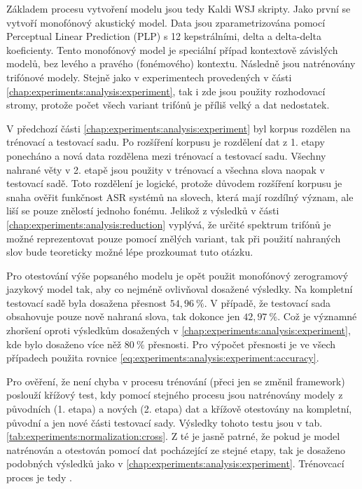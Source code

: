Základem procesu vytvoření modelu jsou tedy Kaldi WSJ skripty. Jako první se vytvoří monofónový akustický model. Data jsou zparametrizována pomocí Perceptual Linear Prediction (PLP) s 12 kepstrálními, delta a delta-delta koeficienty. Tento monofónový model je speciální případ kontextově závislých modelů, bez levého a pravého (fonémového) kontextu. Následně jsou natrénovány trifónové modely. Stejně jako v experimentech provedených v části \ref{chap:experiments:analysis:experiment}, tak i zde jsou použity rozhodovací stromy, protože počet všech variant trifónů je příliš velký a dat nedostatek.

V předchozí části \ref{chap:experiments:analysis:experiment} byl korpus rozdělen na trénovací a testovací sadu. Po rozšíření korpusu je rozdělení dat z 1. etapy ponecháno a nová data rozdělena mezi trénovací a testovací sadu. Všechny nahrané věty v 2. etapě jsou použity v trénovací a všechna slova naopak v testovací sadě. Toto rozdělení je logické, protože důvodem rozšíření korpusu je snaha ověřit funkčnost ASR systémů na slovech, která mají rozdílný význam, ale liší se pouze znělostí jednoho fonému. Jelikož z výsledků v části \ref{chap:experiments:analysis:reduction} vyplývá, že určité spektrum trifónů je možné reprezentovat pouze pomocí znělých variant, tak při použití nahraných slov bude teoreticky možné lépe prozkoumat tuto otázku.

Pro otestování výše popsaného modelu je opět použit monofónový zerogramový jazykový model tak, aby co nejméně ovlivňoval dosažené výsledky. Na kompletní testovací sadě byla dosažena přesnost $54,96\ \%$. V případě, že testovací sada obsahovuje pouze nově nahraná slova, tak dokonce jen $42,97\ \%$. Což je významné zhoršení oproti výsledkům dosažených v \ref{chap:experiments:analysis:experiment}, kde bylo dosaženo více něž $80\ \%$ přesnosti. Pro výpočet přesnosti je ve všech případech použita rovnice \ref{eq:experiments:analysis:experiment:accuracy}.

Pro ověření, že není chyba v procesu trénování (přeci jen se změnil framework) poslouží křížový test, kdy pomocí stejného procesu jsou natrénovány modely z původních (1. etapa) a nových (2. etapa) dat a křížově otestovány na kompletní, původní a jen nové části testovací sady. Výsledky tohoto testu jsou v tab. \ref{tab:experiments:normalization:cross}. Z té je jasně patrné, že pokud je model natrénován a otestován pomocí dat pocházející ze stejné etapy, tak je dosaženo podobných výsledků jako v \ref{chap:experiments:analysis:experiment}. Trénovcací proces je tedy .

